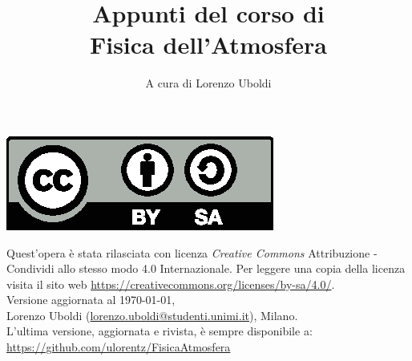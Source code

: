 \documentclass[A4paper, 11pt]{book}
\title{Appunti del corso di 
	\\ \Huge Fisica dell'Atmosfera}
\author{A cura di Lorenzo Uboldi}
\begin{document}
\frontmatter
\maketitle

	
\null %
\vfill %
\hspace*{-1.5em}\includegraphics[scale=.7]{figures/by-sa.eps}
\begin{flushleft}
	Quest'opera è stata rilasciata con licenza \emph{Creative Commons} Attribuzione - Condividi allo stesso modo 4.0 Internazionale. Per leggere una copia della licenza visita il sito web \url{https://creativecommons.org/licenses/by-sa/4.0/}.\\[1cm]
	Versione aggiornata al \today,\\
	Lorenzo Uboldi (\href{mailto:lorenzo.uboldi@studenti.unimi.it}{\ttfamily lorenzo.uboldi@studenti.unimi.it}), Milano.\\[0.2cm]
	L'ultima versione, aggiornata e rivista, è sempre disponibile a: \url{https://github.com/ulorentz/FisicaAtmosfera}
	
\end{flushleft}

\cleardoublepage

\tableofcontents
\mainmatter



\end{document}
